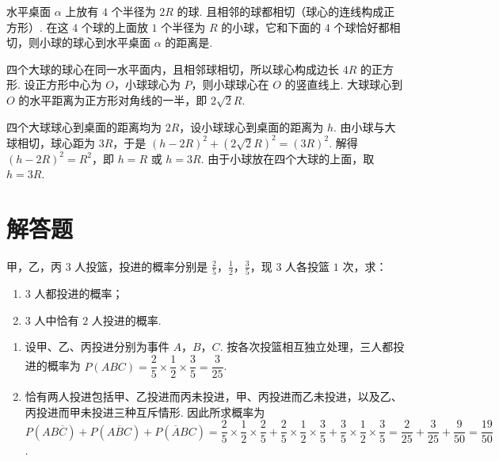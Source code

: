 \begin{problem}
水平桌面 \(\alpha\) 上放有 \(4\) 个半径为 \(2R\) 的球. 且相邻的球都相切（球心的连线构成正方形）. 在这 \(4\) 个球的上面放 \(1\) 个半径为 \(R\) 的小球，它和下面的 \(4\) 个球恰好都相切，则小球的球心到水平桌面 \(\alpha\) 的距离是\fillinblank{}.
\end{problem}


\begin{solution}
四个大球的球心在同一水平面内，且相邻球相切，所以球心构成边长 \(4R\) 的正方形. 设正方形中心为 \(O\)，小球球心为 \(P\)，则小球球心在 \(O\) 的竖直线上. 大球球心到 \(O\) 的水平距离为正方形对角线的一半，即 \(2\sqrt{2}R\).

四个大球球心到桌面的距离均为 \(2R\)，设小球球心到桌面的距离为 \(h\). 由小球与大球相切，球心距为 \(3R\)，于是 \((h-2R)^{2}+(2\sqrt{2}R)^{2}=(3R)^{2}\). 解得 \((h-2R)^{2}=R^{2}\)，即 \(h=R\) 或 \(h=3R\). 由于小球放在四个大球的上面，取 \(h=3R\).
\end{solution}

\section{解答题}
\begin{problem}
甲，乙，丙 \(3\) 人投篮，投进的概率分别是 \(\frac{2}{5}\)，\(\frac{1}{2}\)，\(\frac{3}{5}\)，现 \(3\) 人各投篮 \(1\) 次，求：

\begin{enumerate}
\item \(3\) 人都投进的概率；
\item \(3\) 人中恰有 \(2\) 人投进的概率.
\end{enumerate}
\end{problem}

\begin{solution}
\begin{enumerate}
\item 设甲、乙、丙投进分别为事件 \(A\)，\(B\)，\(C\). 按各次投篮相互独立处理，三人都投进的概率为 \(P(ABC)=\dfrac{2}{5}\times\dfrac{1}{2}\times\dfrac{3}{5}=\dfrac{3}{25}\).
\item 恰有两人投进包括甲、乙投进而丙未投进，甲、丙投进而乙未投进，以及乙、丙投进而甲未投进三种互斥情形. 因此所求概率为
\(P(AB\overline{C})+P(A\overline{B}C)+P(\overline{A}BC)=\dfrac{2}{5}\times\dfrac{1}{2}\times\dfrac{2}{5}+\dfrac{2}{5}\times\dfrac{1}{2}\times\dfrac{3}{5}+\dfrac{3}{5}\times\dfrac{1}{2}\times\dfrac{3}{5}=\dfrac{2}{25}+\dfrac{3}{25}+\dfrac{9}{50}=\dfrac{19}{50}\).
\end{enumerate}
\end{solution}

